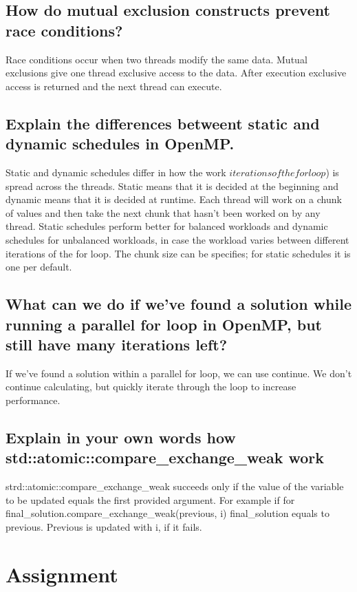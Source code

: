 \documentclass[runningheads]{llncs}
\begin{document}
\subsection{How do mutual exclusion constructs prevent race conditions?}
Race conditions occur when two threads modify the same data. Mutual exclusions give one thread exclusive access to the data. After execution exclusive access is returned and the next thread can execute.

\subsection{Explain the differences betweent static and dynamic schedules in OpenMP.}
Static and dynamic schedules differ in how the work \( iterations of the for loop \)) is spread across the threads. Static means that it is decided at the beginning and dynamic means that it is decided at runtime. Each thread will work on a chunk of values and then take the next chunk that hasn't been worked on by any thread.
Static schedules perform better for balanced workloads and dynamic schedules for unbalanced workloads, in case the workload varies between different iterations of the for loop.
The chunk size can be specifies; for static schedules it is one per default.

\subsection{What can we do if we've found a solution while running a parallel for loop in OpenMP, but still have many iterations left?}
If we've found a solution within a parallel for loop, we can use continue. We don't continue calculating, but quickly iterate through the loop to increase performance.


\subsection{Explain in your own words how std::atomic::compare\_exchange\_weak work}
strd::atomic::compare\_exchange\_weak  succeeds only if the value of the variable to be updated equals the first provided argument.
For example if for final\_solution.compare\_exchange\_weak(previous, i) final\_solution equals to previous. Previous is updated with i, if it fails.

\section{Assignment}
\end{document}
